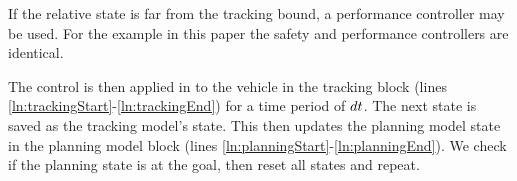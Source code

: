 If the relative state is far from the tracking bound, a performance controller may be used. For the example in this paper the safety and performance controllers are identical.

The control is then applied in to the vehicle in the tracking block (lines \ref{ln:trackingStart}-\ref{ln:trackingEnd}) for a time period of $dt$. The next state is saved as the tracking model's state. This then updates the planning model state in the planning model block (lines \ref{ln:planningStart}-\ref{ln:planningEnd}). We check if the planning state is at the goal, then reset all states and repeat.

